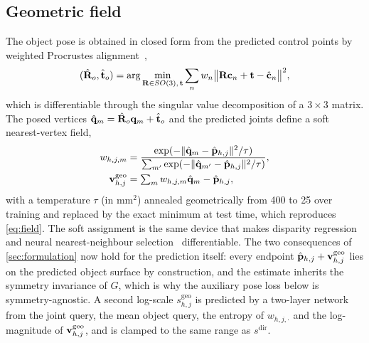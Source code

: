 \subsection{Geometric field}
\label{sec:geo}
The object pose is obtained in closed form from the predicted control points by weighted Procrustes alignment~\cite{kabsch1976solution,arun1987least,umeyama1991least},
\begin{equation}
  (\hat{\mathbf{R}}_o,\hat{\mathbf{t}}_o)=\arg\min_{\mathbf{R}\in SO(3),\,\mathbf{t}}\sum_n w_n\big\|\mathbf{R}\mathbf{c}_n+\mathbf{t}-\hat{\mathbf{c}}_n\big\|^2,
  \label{eq:procrustes}
\end{equation}
which is differentiable through the singular value decomposition of a $3\times3$ matrix. The posed vertices $\hat{\mathbf{q}}_m=\hat{\mathbf{R}}_o\mathbf{q}_m+\hat{\mathbf{t}}_o$ and the predicted joints define a soft nearest-vertex field,
\begin{align}
  w_{h,j,m}&=\frac{\exp(-\|\hat{\mathbf{q}}_m-\hat{\mathbf{p}}_{h,j}\|^2/\tau)}{\sum_{m'}\exp(-\|\hat{\mathbf{q}}_{m'}-\hat{\mathbf{p}}_{h,j}\|^2/\tau)},\label{eq:softw}\\
  \mathbf{v}^{\text{geo}}_{h,j}&=\textstyle\sum_m w_{h,j,m}\hat{\mathbf{q}}_m-\hat{\mathbf{p}}_{h,j},\label{eq:softnn}
\end{align}
with a temperature $\tau$ (in $\mathrm{mm}^2$) annealed geometrically from 400 to 25 over training and replaced by the exact minimum at test time, which reproduces \cref{eq:field}. The soft assignment is the same device that makes disparity regression~\cite{kendall2017gcnet} and neural nearest-neighbour selection~\cite{plotz2018n3net} differentiable. The two consequences of \cref{sec:formulation} now hold for the prediction itself: every endpoint $\hat{\mathbf{p}}_{h,j}+\mathbf{v}^{\text{geo}}_{h,j}$ lies on the predicted object surface by construction, and the estimate inherits the symmetry invariance of $G$, which is why the auxiliary pose loss below is symmetry-agnostic. A second log-scale $s^{\text{geo}}_{h,j}$ is predicted by a two-layer network from the joint query, the mean object query, the entropy of $w_{h,j,\cdot}$ and the log-magnitude of $\mathbf{v}^{\text{geo}}_{h,j}$, and is clamped to the same range as $s^{\text{dir}}$.

